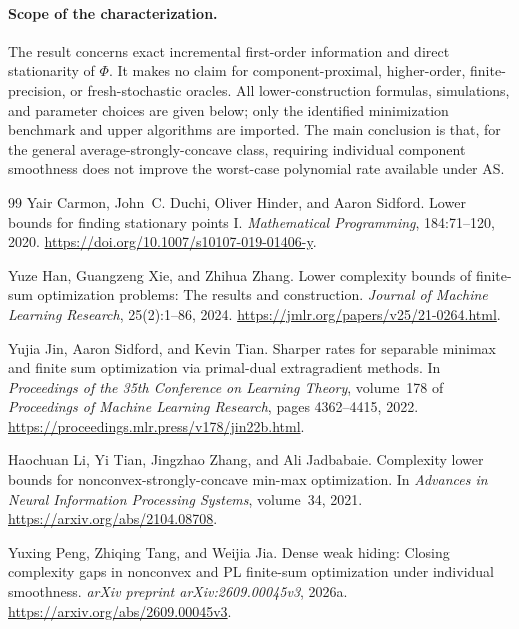 \documentclass[11pt,letterpaper]{article}
\theoremstyle{definition}
\theoremstyle{remark}
\begin{document}
\paragraph{Scope of the characterization.}
The result concerns exact incremental first-order information and direct
stationarity of $\Phi$. It makes no claim for component-proximal,
higher-order, finite-precision, or fresh-stochastic oracles. All
lower-construction formulas, simulations, and parameter choices are given
below; only the identified minimization benchmark and upper algorithms are
imported. The main conclusion is that, for the general average-strongly-concave
class, requiring individual component smoothness does not improve the
worst-case polynomial rate available under AS.


\clearpage
\begin{thebibliography}{99}
\setlength{\bibsep}{5pt}
Yair Carmon, John~C. Duchi, Oliver Hinder, and Aaron Sidford.
\newblock Lower bounds for finding stationary points I.
\newblock \emph{Mathematical Programming}, 184:71--120, 2020.
\newblock \url{https://doi.org/10.1007/s10107-019-01406-y}.

Yuze Han, Guangzeng Xie, and Zhihua Zhang.
\newblock Lower complexity bounds of finite-sum optimization problems: The results and construction.
\newblock \emph{Journal of Machine Learning Research}, 25(2):1--86, 2024.
\newblock \url{https://jmlr.org/papers/v25/21-0264.html}.

Yujia Jin, Aaron Sidford, and Kevin Tian.
\newblock Sharper rates for separable minimax and finite sum optimization via primal-dual extragradient methods.
\newblock In \emph{Proceedings of the 35th Conference on Learning Theory}, volume~178 of \emph{Proceedings of Machine Learning Research}, pages 4362--4415, 2022.
\newblock \url{https://proceedings.mlr.press/v178/jin22b.html}.

Haochuan Li, Yi Tian, Jingzhao Zhang, and Ali Jadbabaie.
\newblock Complexity lower bounds for nonconvex-strongly-concave min-max optimization.
\newblock In \emph{Advances in Neural Information Processing Systems}, volume~34, 2021.
\newblock \url{https://arxiv.org/abs/2104.08708}.

Yuxing Peng, Zhiqing Tang, and Weijia Jia.
\newblock Dense weak hiding: Closing complexity gaps in nonconvex and {PL} finite-sum optimization under individual smoothness.
\newblock \emph{arXiv preprint arXiv:2609.00045v3}, 2026a.
\newblock \url{https://arxiv.org/abs/2609.00045v3}.


\end{thebibliography}
\end{document}
